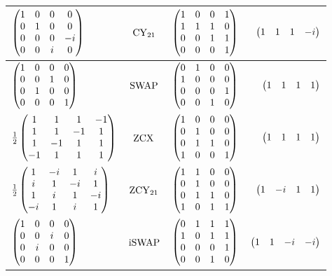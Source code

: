 \documentclass[a4paper,english]{scrartcl}
\begin{document}
\begin{proposition}
\begin{table}[H]
\begin{tabular}{lccr}
  \midrule
  $\begin{pmatrix}1&0&0&0\\0&1&0&0\\0&0&0&-i\\0&0&i&0\end{pmatrix}$ & $\cy_{21}$ &
  $\begin{pmatrix}1&0&0&1\\1&1&1&0\\0&0&1&1\\0&0&0&1\end{pmatrix}$ & $\begin{pmatrix}1&1&1&-i\end{pmatrix}$\\
  \midrule
  $\begin{pmatrix}1&0&0&0\\0&0&1&0\\0&1&0&0\\0&0&0&1\end{pmatrix}$ & $\Swap$ &
  $\begin{pmatrix}0&1&0&0\\1&0&0&0\\0&0&0&1\\0&0&1&0\end{pmatrix}$ & $\begin{pmatrix}1&1&1&1\end{pmatrix}$\\
  \midrule
  $\frac{1}{2}\begin{pmatrix}1&1&1&-1\\1&1&-1&1\\1&-1&1&1\\-1&1&1&1\end{pmatrix}$ & $\zcx$ &
  $\begin{pmatrix}1&0&0&0\\0&1&0&0\\0&1&1&0\\1&0&0&1\end{pmatrix}$ & $\begin{pmatrix}1&1&1&1\end{pmatrix}$\\
  \midrule
  $\frac{1}{2}\begin{pmatrix}1&-i&1&i\\i&1&-i&1\\1&i&1&-i\\-i&1&i&1\end{pmatrix}$ & $\zcy_{21}$ &
  $\begin{pmatrix}1&1&0&0\\0&1&0&0\\0&1&1&0\\1&0&1&1\end{pmatrix}$ & $\begin{pmatrix}1&-i&1&1\end{pmatrix}$\\
  \midrule
  $\begin{pmatrix}1&0&0&0\\0&0&i&0\\0&i&0&0\\0&0&0&1\end{pmatrix}$ & $\iSwap$ &
  $\begin{pmatrix}0&1&1&1\\1&0&1&1\\0&0&0&1\\0&0&1&0\end{pmatrix}$ & $\begin{pmatrix}1&1&-i&-i\end{pmatrix}$\\
  \bottomrule
\end{tabular}
\end{table}
\end{proposition}
\end{document}
